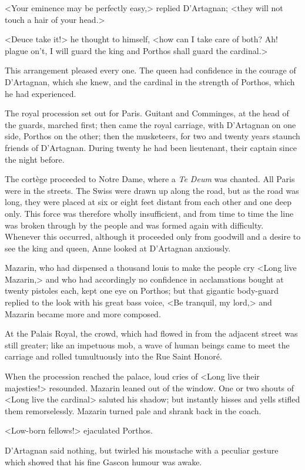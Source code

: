 <Your eminence may be perfectly easy,> replied D'Artagnan; <they will not touch a hair of your head.>

<Deuce take it!> he thought to himself, <how can I take care of both? Ah! plague on't, I will guard the king and Porthos shall guard the cardinal.>

This arrangement pleased every one. The queen had confidence in the courage of D'Artagnan, which she knew, and the cardinal in the strength of Porthos, which he had experienced.

The royal procession set out for Paris. Guitant and Comminges, at the head of the guards, marched first; then came the royal carriage, with D'Artagnan on one side, Porthos on the other; then the musketeers, for two and twenty years staunch friends of D'Artagnan. During twenty he had been lieutenant, their captain since the night before.

The cortège proceeded to Notre Dame, where a \textit{Te Deum} was chanted. All Paris were in the streets. The Swiss were drawn up along the road, but as the road was long, they were placed at six or eight feet distant from each other and one deep only. This force was therefore wholly insufficient, and from time to time the line was broken through by the people and was formed again with difficulty. Whenever this occurred, although it proceeded only from goodwill and a desire to see the king and queen, Anne looked at D'Artagnan anxiously.

Mazarin, who had dispensed a thousand louis to make the people cry <Long live Mazarin,> and who had accordingly no confidence in acclamations bought at twenty pistoles each, kept one eye on Porthos; but that gigantic body-guard replied to the look with his great bass voice, <Be tranquil, my lord,> and Mazarin became more and more composed.

At the Palais Royal, the crowd, which had flowed in from the adjacent street was still greater; like an impetuous mob, a wave of human beings came to meet the carriage and rolled tumultuously into the Rue Saint Honoré.

When the procession reached the palace, loud cries of <Long live their majesties!> resounded. Mazarin leaned out of the window. One or two shouts of <Long live the cardinal> saluted his shadow; but instantly hisses and yells stifled them remorselessly. Mazarin turned pale and shrank back in the coach.

<Low-born fellows!> ejaculated Porthos.

D'Artagnan said nothing, but twirled his moustache with a peculiar gesture which showed that his fine Gascon humour was awake.

